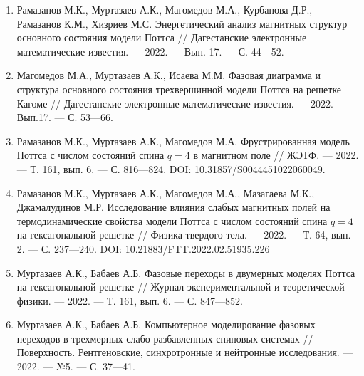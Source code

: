 \begin{enumerate}[1]
    \item
    Рамазанов М.К., Муртазаев А.К., Магомедов М.А., Курбанова Д.Р., Рамазанов К.М., Хизриев М.С.
    Энергетический анализ магнитных структур основного состояния модели Поттса
    //
    Дагестанские электронные математические известия.
    --- 2022.
    --- Вып. 17.
    --- С. 44---52.

    \item
    Магомедов М.А., Муртазаев А.К., Исаева М.М.
    Фазовая диаграмма и структура основного состояния трехвершинной модели Поттса на решетке Кагоме
    //
    Дагестанские электронные математические известия.
    --- 2022.
    --- Вып.17.
    --- С. 53---66.

    \item
    Рамазанов М.К., Муртазаев А.К., Магомедов М.А.
    Фрустрированная модель Поттса с числом состояний спина $q = 4$ в магнитном поле
    //
    ЖЭТФ.
    --- 2022.
    --- Т. 161, вып. 6.
    --- С. 816---824. DOI: 10.31857/S0044451022060049.

    \item
    Рамазанов М.К., Муртазаев А.К., Магомедов М.А., Мазагаева М.К., Джамалудинов М.Р.
    Исследование влияния слабых магнитных полей на термодинамические свойства модели Поттса с числом состояний спина $q = 4$ на гексагональной решетке
    //
    Физика твердого тела.
    --- 2022.
    --- Т. 64, вып. 2.
    --- С. 237---240. DOI: 10.21883/FTT.2022.02.51935.226



    \item
    Муртазаев А.К., Бабаев А.Б.
    Фазовые переходы в двумерных моделях Поттса на гексагональной решетке
    //
    Журнал экспериментальной и теоретической физики.
    --- 2022.
    --- Т. 161, вып. 6.
    --- С. 847---852.

    \item
    Муртазаев А.К., Бабаев А.Б.
    Компьютерное моделирование фазовых переходов в трехмерных слабо разбавленных спиновых системах
    //
    Поверхность. Рентгеновские, синхротронные и нейтронные исследования.
    --- 2022.
    --- №5.
    --- С. 37---41.

\end{enumerate}



